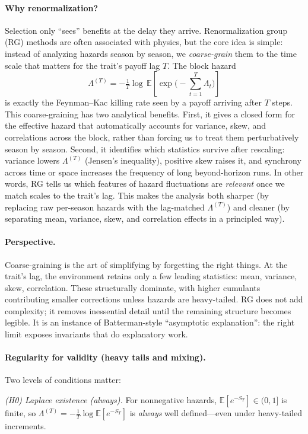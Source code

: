 \documentclass[11pt]{article}
\theoremstyle{upright}
\newcommand{\E}{\mathbb{E}}
\newcommand{\hazT}[1]{\Lambda^{(#1)}}          %
\begin{document}
\paragraph{Why renormalization?}
Selection only “sees” benefits at the delay they arrive.  
Renormalization group (RG) methods are often associated with physics, but the
core idea is simple: instead of analyzing hazards season by season, we
\emph{coarse-grain} them to the time scale that matters for the trait’s payoff
lag $T$. The block hazard
\[
\hazT{T}=-\tfrac{1}{T}\log \,\E\!\left[\exp\!\Big(-\sum_{t=1}^T \Lambda_t\Big)\right]
\]
is exactly the Feynman--Kac killing rate seen by a payoff arriving after $T$
steps. This coarse-graining has two analytical benefits. First, it gives a
closed form for the effective hazard that automatically accounts for variance,
skew, and correlations across the block, rather than forcing us to treat them
perturbatively season by season. Second, it identifies which statistics
survive after rescaling: variance lowers $\hazT{T}$ (Jensen’s inequality),
positive skew raises it, and synchrony across time or space increases the
frequency of long beyond-horizon runs. In other words, RG tells us which
features of hazard fluctuations are \emph{relevant} once we match scales to the
trait’s lag. This makes the analysis both sharper (by replacing raw per-season
hazards with the lag-matched $\hazT{T}$) and cleaner (by separating mean,
variance, skew, and correlation effects in a principled way).

\paragraph{Perspective.}
Coarse-graining is the art of simplifying by forgetting the right things.
At the trait’s lag, the environment retains only a few leading statistics: mean, variance, skew, correlation.
These structurally dominate, with higher cumulants contributing smaller corrections unless hazards are heavy-tailed.
RG does not add complexity; it removes inessential detail until the remaining structure becomes legible.
It is an instance of Batterman-style “asymptotic explanation”: the right limit exposes invariants that do explanatory work.

\paragraph{Regularity for validity (heavy tails and mixing).}
Two levels of conditions matter:

\emph{(H0) Laplace existence (always).} For nonnegative hazards, \(\E[e^{-S_T}]\in(0,1]\) is finite, so \(\hazT{T}=-\tfrac{1}{T}\log\E[e^{-S_T}]\) is \emph{always} well defined—even under heavy-tailed increments.
\end{document}
